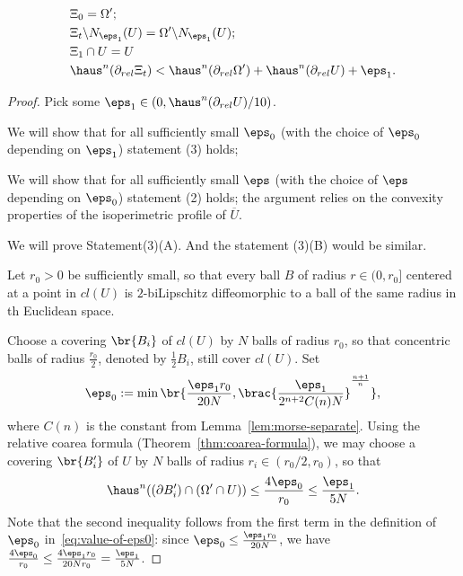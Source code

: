 \begin{lemma}
\begin{enumerate}
\begin{enumerate}
\begin{equation*}
                \begin{split}
                    &\Xi_0 = \Omega';\\
                    &\Xi_t\backslash N_{\eps_1}(U) = \Omega'\backslash N_{\eps_1}(U);\\
                    &\Xi_1\cap U = U\\
                    &\haus^n(\partial_{rel}\Xi_t) < \haus^n(\partial_{rel}\Omega') + \haus^n(\partial_{rel}U) + \eps_1.
                \end{split}
            \end{equation*}
        \end{enumerate}
    \end{enumerate}
    \begin{proof}
        Pick some $\eps_1 \in (0, \haus^{n}(\partial_{rel}U)/10)$. 
        
        We will show that for all sufficiently small $\eps_0$ (with the choice of $\eps_0$ depending on $\eps_1$) statement (3) holds;  

        We will show that for all sufficiently small $\eps$ (with the choice of $\eps$ depending on $\eps_0$) statement (2) holds; the argument relies on the convexity properties of the isoperimetric profile of $\overline{U}$.

        We will prove Statement(3)(A). And the statement (3)(B) would be similar.

        Let $r_0 > 0$ be sufficiently small, so that every ball $B$ of radius $r \in (0, r_0]$ centered at a point in $cl(U)$ is $2$-biLipschitz diffeomorphic to a ball of the same radius in th Euclidean space.

        Choose a covering $\br{B_i}$ of $cl(U)$ by $N$ balls of radius $r_0$, so that concentric balls of radius $\frac{r_0}{2}$, denoted by $\frac{1}{2}B_i$, still cover $cl(U)$. Set
        \begin{equation}\label{eq:value-of-eps0}
            \eps_0 := \min\br{\frac{\eps_1 r_0}{20 N}, \brac{\frac{\eps_1}{2^{n + 2}C(n)N}}^{\frac{n + 1}{n}}},
        \end{equation}
        where $C(n)$ is the constant from Lemma~\ref{lem:morse-separate}. Using the relative coarea formula (Theorem~\ref{thm:coarea-formula}), we may choose a covering $\br{B_i'}$ of $U$ by $N$ balls of radius $r_i \in (r_0/2, r_0)$, so that         \begin{equation}\label{eq:area-of-Bi}
            \haus^n((\partial B_i')\cap(\Omega'\cap U)) \leq \frac{4\eps_0}{r_0} \leq \frac{\eps_1}{5N}.
        \end{equation}
        Note that the second inequality follows from the first term in the definition of $\eps_0$ in~\eqref{eq:value-of-eps0}: since $\eps_0 \leq \frac{\eps_1 r_0}{20N}$, we have $\frac{4\eps_0}{r_0} \leq \frac{4\eps_1 r_0}{20Nr_0} = \frac{\eps_1}{5N}$.


\end{proof}
\end{lemma}
